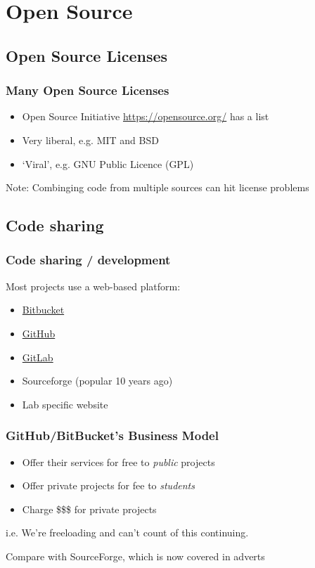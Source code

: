 \section{Open Source}

\subsection{Open Source Licenses}

\begin{frame}
  \frametitle{Many Open Source Licenses}
  \begin{itemize}
    \item Open Source Initiative \url{https://opensource.org/} has a list
    \item Very liberal, e.g. MIT and BSD
    \item `Viral', e.g. GNU Public Licence (GPL)
  \end{itemize}
  Note: Combinging code from multiple  sources can hit license problems
\end{frame}

\subsection{Code sharing}

\begin{frame}
  \frametitle{Code sharing / development}
  Most projects use a web-based platform:
  \begin{itemize}
    \item \href{https://bitbucket.org/product}{Bitbucket}
    \item \href{https://github.com/}{GitHub}
    \item \href{https://about.gitlab.com/}{GitLab}
    \item Sourceforge (popular 10 years ago)
    \item Lab specific website
  \end{itemize}
\end{frame}

\begin{frame}
  \frametitle{GitHub/BitBucket's Business Model}
  \begin{itemize}
    \item Offer their services for free to \emph{public} projects
    \item Offer private projects for fee to \emph{students}
    \item Charge \$\$\$ for private projects
  \end{itemize}
  i.e. We're freeloading and can't count of this continuing.

  Compare with SourceForge, which is now covered in adverts
\end{frame}

